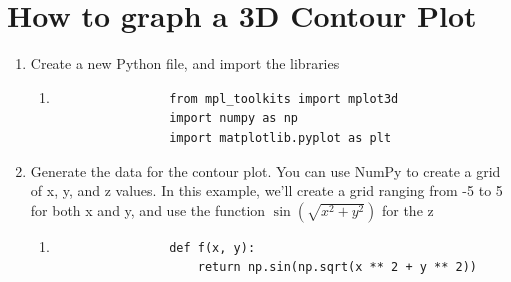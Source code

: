 \documentclass[
11pt, %
a4paper, %
oneside, %
headinclude,footinclude, %
BCOR5mm, %
]{scrartcl}
\begin{document}

\section{How to graph a 3D Contour Plot}

\begin{enumerate}
    \item Create a new Python file, and import the libraries
        \begin{enumerate}
        	\item[] \begin{verbatim}
        		from mpl_toolkits import mplot3d
        		import numpy as np
        		import matplotlib.pyplot as plt
        	\end{verbatim}
        \end{enumerate}
    \item Generate the data for the contour plot. You can use NumPy to create a grid of x, y, and z values. In this example, we'll create a grid ranging from -5 to 5 for both x and y, and use the function $\sin(\sqrt{x^2 + y^2})$ for the z
        \begin{enumerate}
        	\item[] \begin{verbatim}
        		def f(x, y):
        		    return np.sin(np.sqrt(x ** 2 + y ** 2))
        		

\end{verbatim}
\end{enumerate}
\end{enumerate}
\end{document}
